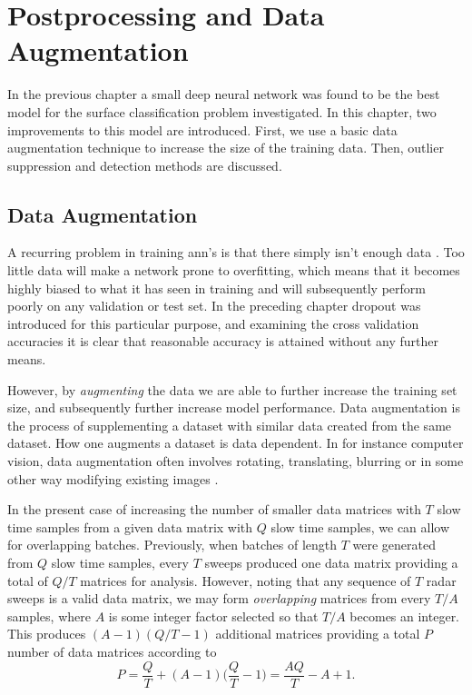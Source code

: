 \chapter{Postprocessing and Data Augmentation}

In the previous chapter a small deep neural network was found to be the best model for the surface classification problem investigated. In this chapter, two improvements to this model are introduced. First, we use a basic data augmentation technique to increase the size of the training data. Then, outlier suppression and detection methods are discussed.

\section{Data Augmentation}

A recurring problem in training \gls{ann}'s is that there simply isn't enough data \citep{lemley_bazrafkan_corcoran_2017}. Too little data will make a network prone to overfitting, which means that it becomes highly biased to what it has seen in training and will subsequently perform poorly on any validation or test set. In the preceding chapter dropout was introduced for this particular purpose, and examining the cross validation accuracies it is clear that reasonable accuracy is attained without any further means.

However, by \emph{augmenting} the data we are able to further increase the training set size, and subsequently further increase model performance. Data augmentation is the process of supplementing a dataset with similar data created from the same dataset. How one augments a dataset is data dependent. In for instance computer vision, data augmentation often involves rotating, translating, blurring or in some other way modifying existing images \citep{lemley_bazrafkan_corcoran_2017}.

In the present case of increasing the number of smaller data matrices with $T$ slow time samples from a given data matrix with $Q$ slow time samples, we can allow for overlapping batches. Previously, when batches of length $T$ were generated from $Q$ slow time samples, every $T$ sweeps produced one data matrix providing a total of $Q/T$ matrices for analysis. However, noting that any sequence of $T$ radar sweeps is a valid data matrix, we may form \emph{overlapping} matrices from every $T/A$ samples, where $A$ is some integer factor selected so that $T/A$ becomes an integer. This produces $(A-1)(Q/T-1)$ additional matrices providing a total $P$ number of data matrices according to
\begin{equation}
	P = 
	\frac{Q}{T} + (A-1)\Big(\frac{Q}{T} - 1\Big) = 
	\frac{AQ}{T}-A+1.
\end{equation}

